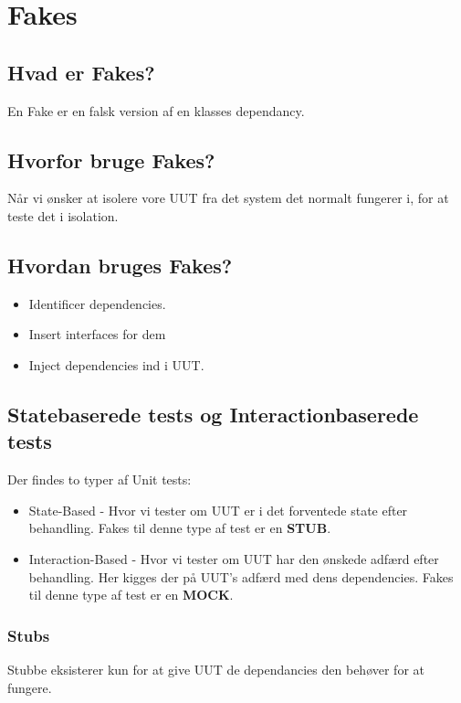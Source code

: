 \section{Fakes}

\subsection{Hvad er Fakes?}
En Fake er en falsk version af en klasses dependancy.

\subsection{Hvorfor bruge Fakes?}
Når vi ønsker at isolere vore UUT fra det system det normalt fungerer i, for at teste det i isolation.

\subsection{Hvordan bruges Fakes?}

\begin{itemize}
	\item Identificer dependencies.
	\item Insert interfaces for dem
	\item Inject dependencies ind i UUT. 
\end{itemize}

\subsection{Statebaserede tests og Interactionbaserede tests}
Der findes to typer af Unit tests:

\begin{itemize}
	\item State-Based - Hvor vi tester om UUT er i det forventede state efter behandling. Fakes til denne type af test er en \textbf{STUB}.
	\item Interaction-Based - Hvor vi tester om UUT har den ønskede adfærd efter behandling. Her kigges der på UUT's adfærd med dens dependencies. Fakes til denne type af test er en \textbf{MOCK}.
\end{itemize}

\subsubsection{Stubs}
Stubbe eksisterer kun for at give UUT de dependancies den behøver for at fungere.

